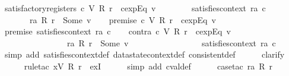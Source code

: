 \begin{isabellebody}
\isanewline
{}\isamarkupfalse%
\ satisfactory{\isacharunderscore}registers{\isacharcolon}\ {\isachardoublequoteopen}c\ {\isacharparenleft}V\ {\isacharparenleft}R\ r{\isacharparenright}{\isacharparenright}\ {\isacharequal}\ {\isacharbraceleft}{\isacharbar}cexp{\isachardot}Eq\ v{\isacharbar}{\isacharbraceright}\ {\isasymLongrightarrow}\isanewline
\ \ \ \ \ \ \ satisfies{\isacharunderscore}context\ ra\ c\ {\isasymLongrightarrow}\isanewline
\ \ \ \ \ \ \ ra\ {\isacharparenleft}R\ r{\isacharparenright}\ {\isacharequal}\ Some\ v{\isachardoublequoteclose}\isanewline
%
\isadelimproof
%
\endisadelimproof
%
\isatagproof
{}\isamarkupfalse%
{\isacharminus}\isanewline
\ \ \isamarkupfalse%
\ premise{}{\isacharcolon}\ {\isachardoublequoteopen}c\ {\isacharparenleft}V\ {\isacharparenleft}R\ r{\isacharparenright}{\isacharparenright}\ {\isacharequal}\ {\isacharbraceleft}{\isacharbar}cexp{\isachardot}Eq\ v{\isacharbar}{\isacharbraceright}{\isachardoublequoteclose}\isanewline
\ \ \isamarkupfalse%
\ premise{}{\isacharcolon}\ {\isachardoublequoteopen}satisfies{\isacharunderscore}context\ ra\ c{\isachardoublequoteclose}\isanewline
\ \ \isamarkupfalse%
\ contra{\isacharcolon}\ {\isachardoublequoteopen}c\ {\isacharparenleft}V\ {\isacharparenleft}R\ r{\isacharparenright}{\isacharparenright}\ {\isacharequal}\ {\isacharbraceleft}{\isacharbar}cexp{\isachardot}Eq\ v{\isacharbar}{\isacharbraceright}\ {\isasymLongrightarrow}\isanewline
\ \ \ \ \ \ \ \ \ \ \ \ \ \ \ \ ra\ {\isacharparenleft}R\ r{\isacharparenright}\ {\isasymnoteq}\ Some\ v\ {\isasymLongrightarrow}\isanewline
\ \ \ \ \ \ \ \ \ \ \ \ \ \ \ \ {\isasymnot}satisfies{\isacharunderscore}context\ ra\ c{\isachardoublequoteclose}\isanewline
\ \ \ \ \isamarkupfalse%
\ {\isacharparenleft}simp\ add{\isacharcolon}\ satisfies{\isacharunderscore}context{\isacharunderscore}def\ datastate{}context{\isacharunderscore}def\ consistent{\isacharunderscore}def{\isacharparenright}\isanewline
\ \ \ \ \isamarkupfalse%
\ clarify\isanewline
\ \ \ \ \isamarkupfalse%
\ {\isacharparenleft}rule{\isacharunderscore}tac\ x{\isacharequal}{\isachardoublequoteopen}V\ {\isacharparenleft}R\ r{\isacharparenright}{\isachardoublequoteclose}\ \ exI{\isacharparenright}\isanewline
\ \ \ \ \isamarkupfalse%
\ {\isacharparenleft}simp\ add{\isacharcolon}\ cval{\isacharunderscore}def{\isacharparenright}\isanewline
\ \ \ \ \isamarkupfalse%
\ {\isacharparenleft}case{\isacharunderscore}tac\ {\isachardoublequoteopen}ra\ {\isacharparenleft}R\ r{\isacharparenright}{\isachardoublequoteclose}{\isacharparenright}\isanewline

\end{isabellebody}
